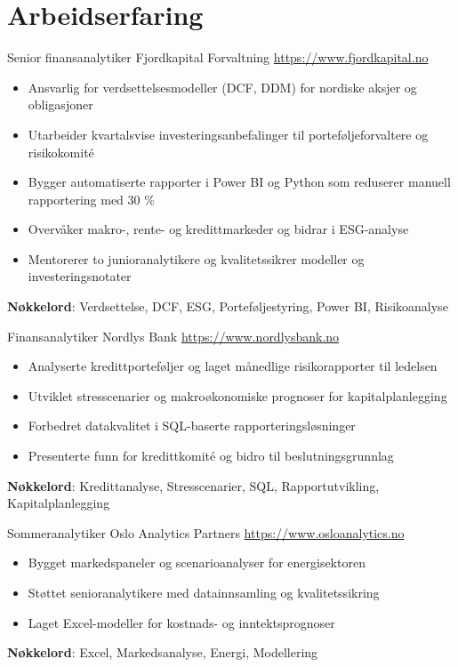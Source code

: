 \documentclass[a4paper, serif, 10pt]{moderncv}
\begin{document}
\section{Arbeidserfaring}

        {Senior finansanalytiker}
        {Fjordkapital Forvaltning}
        {\url{https://www.fjordkapital.no}}
        {}
        {\begin{itemize}
\item Ansvarlig for verdsettelsesmodeller (DCF, DDM) for nordiske aksjer og obligasjoner
\item Utarbeider kvartalsvise investeringsanbefalinger til porteføljeforvaltere og risikokomité
\item Bygger automatiserte rapporter i Power BI og Python som reduserer manuell rapportering med 30 \%
\item Overvåker makro-, rente- og kredittmarkeder og bidrar i ESG-analyse
\item Mentorerer to junioranalytikere og kvalitetssikrer modeller og investeringsnotater
\end{itemize}
\textbf{Nøkkelord}: Verdsettelse, DCF, ESG, Porteføljestyring, Power BI, Risikoanalyse}

        {Finansanalytiker}
        {Nordlys Bank}
        {\url{https://www.nordlysbank.no}}
        {}
        {\begin{itemize}
\item Analyserte kredittporteføljer og laget månedlige risikorapporter til ledelsen
\item Utviklet stresscenarier og makroøkonomiske prognoser for kapitalplanlegging
\item Forbedret datakvalitet i SQL-baserte rapporteringsløsninger
\item Presenterte funn for kredittkomité og bidro til beslutningsgrunnlag
\end{itemize}
\textbf{Nøkkelord}: Kredittanalyse, Stresscenarier, SQL, Rapportutvikling, Kapitalplanlegging}

        {Sommeranalytiker}
        {Oslo Analytics Partners}
        {\url{https://www.osloanalytics.no}}
        {}
        {\begin{itemize}
\item Bygget markedspaneler og scenarioanalyser for energisektoren
\item Støttet senioranalytikere med datainnsamling og kvalitetssikring
\item Laget Excel-modeller for kostnads- og inntektsprognoser
\end{itemize}
\textbf{Nøkkelord}: Excel, Markedsanalyse, Energi, Modellering}
\end{document}
